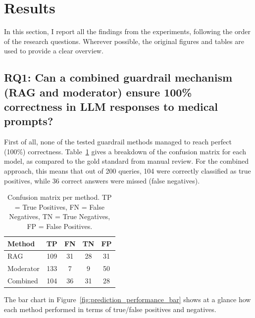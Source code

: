 \section{Results}

In this section, I report all the findings from the experiments, following the order of the research questions. Wherever possible, the original figures and tables are used to provide a clear overview.

\subsection{RQ1: Can a combined guardrail mechanism (RAG and moderator) ensure 100\% correctness in LLM responses to medical prompts?}

First of all, none of the tested guardrail methods managed to reach perfect (100\%) correctness. Table~\ref{tab:confusionmatrix} gives a breakdown of the confusion matrix for each model, as compared to the gold standard from manual review. For the combined approach, this means that out of 200 queries, 104 were correctly classified as true positives, while 36 correct answers were missed (false negatives).

\begin{table}[ht]
\centering
\caption{Confusion matrix per method. TP = True Positives, FN = False Negatives, TN = True Negatives, FP = False Positives.}
\label{tab:confusionmatrix}
\begin{tabular}{lcccc}
\toprule
Method & TP & FN & TN & FP \\
\midrule
RAG        & 109 & 31 & 28 & 31 \\
Moderator  & 133 & 7  & 9  & 50 \\
Combined   & 104 & 36 & 31 & 28 \\
\bottomrule
\end{tabular}
\end{table}

The bar chart in Figure~\ref{fig:prediction_performance_bar} shows at a glance how each method performed in terms of true/false positives and negatives.

